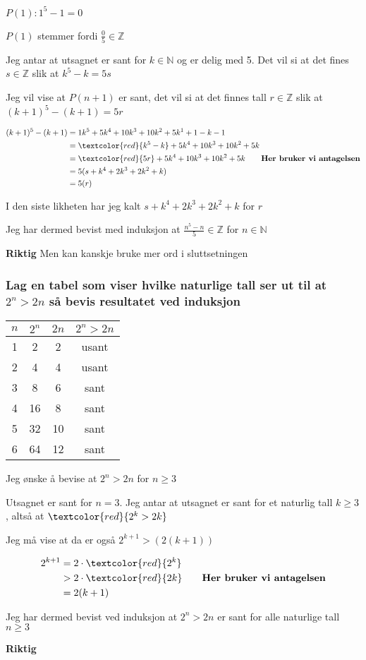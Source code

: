 \documentclass{article}
\begin{document}
$P(1): 1^5-1=0$

$P(1)$ stemmer fordi $\frac{0}{5}\in \mathbb{Z}$

Jeg antar at utsagnet er sant for $k \in \mathbb{N}$ og er delig med 5. Det vil si at det fines $s \in \mathbb{Z}$ slik at $k^5-k=5s$

Jeg vil vise at $P(n+1)$ er sant, det vil si at det finnes tall $r \in \mathbb{Z}$ slik at $(k+1)^5-(k+1)=5r$

\begin{align*}
    (k+1)^5-(k+1) &= 1k^5+5k^4+10k^3+10k^2+5k^1+1-k-1 \\
    &= \textcolor{red}{k^5-k}+5k^4+10k^3+10k^2+5k \\
    &= \textcolor{red}{5r}+5k^4+10k^3+10k^2+5k \qquad \textbf{Her bruker vi antagelsen}\\
    &= 5(s+k^4+2k^3+2k^2+k) \\
    &= 5(r)
\end{align*}

I den siste likheten har jeg kalt $s+k^4+2k^3+2k^2+k$ for $r$

Jeg har dermed bevist med induksjon at $\frac{n^5-n}{5} \in \mathbb{Z}$ for $n \in \mathbb{N}$

\textbf{Riktig}
Men kan kanskje bruke mer ord i sluttsetningen

\subsubsection{Lag en tabel som viser hvilke naturlige tall ser ut til at $2^n > 2n$ så bevis resultatet ved induksjon}

\begin{tabular}{|c|c|c|c|}
    \hline
    $n$ & $2^n$ & $2n$ & $2^n > 2n$ \\
    \hline
    1 & 2 & 2 & usant \\
    2 & 4 & 4 & usant \\
    3 & 8 & 6 & sant \\
    4 & 16 & 8 & sant \\
    5 & 32 & 10 & sant \\
    6 & 64 & 12 & sant \\
    \hline
\end{tabular}

Jeg ønske å bevise at $2^n > 2n$ for $n \ge 3$

Utsagnet er sant for $n=3$. Jeg antar at utsagnet er sant for et naturlig tall $k \ge 3$, altså at $\textcolor{red}{2^k > 2k}$

Jeg må vise at da er også $2^{k+1} > (2(k+1))$

\begin{align*}
2^{k+1} &= 2 \cdot \textcolor{red}{2^k} \\
&> 2 \cdot \textcolor{red}{2k} \qquad \textbf{Her bruker vi antagelsen} \\
&= 2(k+1)
\end{align*}

Jeg har dermed bevist ved induksjon at $2^n > 2n$ er sant for alle naturlige tall $n \ge 3$

\textbf{Riktig}



\end{document}
